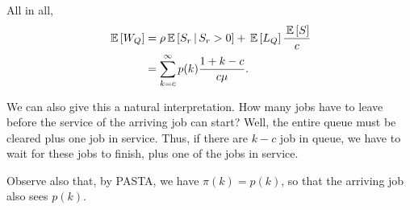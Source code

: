\begin{question}
\begin{solution}
All in all,
\begin{equation*}
  \begin{split}
  \,\mathbb{E}\left[W_Q\right] 
&= \rho\,\mathbb{E}\left[S_r\,\middle|\, S_r>0\right]  +   \,\mathbb{E}\left[L_Q\right]\frac{\,\mathbb{E}\left[S\right]}c \\
&= \sum_{k=c}^\infty p(k)\frac{1+k-c}{c\mu}.
  \end{split}
\end{equation*}

We can also give this a natural interpretation. How many jobs have to
leave before the service of the arriving job can start? Well, the
entire queue must be cleared plus one job in service. Thus, if there
are $k-c$ job in queue, we have to wait for these jobs to finish, plus
one of the jobs in service. 

Observe also that, by PASTA, we have $\pi(k) = p(k)$, so that the
arriving job also sees $p(k)$.

  \end{solution}
\end{question}


